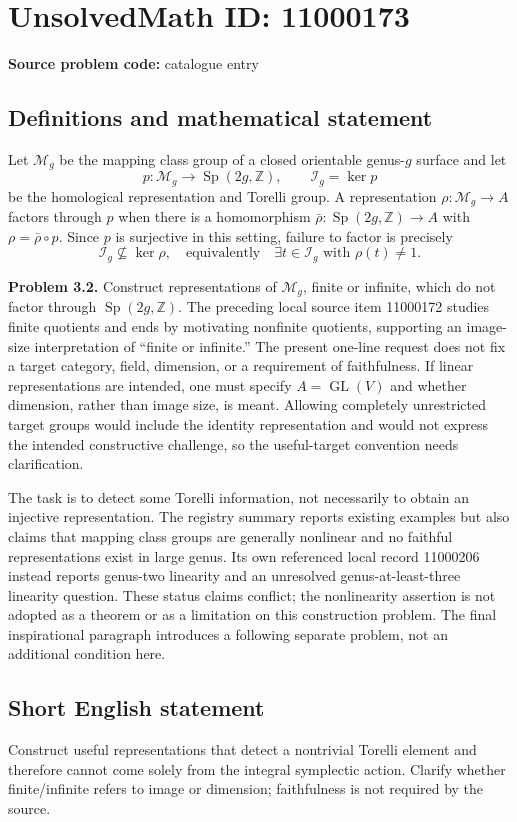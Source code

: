 \documentclass[11pt]{article}
\newcommand{\Z}{\mathbb{Z}}
\begin{document}
\section*{UnsolvedMath ID: 11000173}
\textbf{Source problem code:} catalogue entry
\subsection{Definitions and mathematical statement}
Let $\mathcal M_g$ be the mapping class group of a closed orientable genus-$g$ surface and let
\[
 p:\mathcal M_g\longrightarrow\operatorname{Sp}(2g,\Z),\qquad
 \mathcal I_g=\ker p
\]
be the homological representation and Torelli group. A representation $\rho:\mathcal M_g\to A$ factors through $p$ when there is a homomorphism $\bar\rho:\operatorname{Sp}(2g,\Z)\to A$ with $\rho=\bar\rho\circ p$. Since $p$ is surjective in this setting, failure to factor is precisely
\[
 \mathcal I_g\not\subseteq\ker\rho,
 \quad\text{equivalently}\quad
 \exists t\in\mathcal I_g\text{ with }\rho(t)\ne1.
\]

\textbf{Problem 3.2.} Construct representations of $\mathcal M_g$, finite or infinite, which do not factor through $\operatorname{Sp}(2g,\Z)$. The preceding local source item 11000172 studies finite quotients and ends by motivating nonfinite quotients, supporting an image-size interpretation of ``finite or infinite.'' The present one-line request does not fix a target category, field, dimension, or a requirement of faithfulness. If linear representations are intended, one must specify $A=\operatorname{GL}(V)$ and whether dimension, rather than image size, is meant. Allowing completely unrestricted target groups would include the identity representation and would not express the intended constructive challenge, so the useful-target convention needs clarification.

The task is to detect some Torelli information, not necessarily to obtain an injective representation. The registry summary reports existing examples but also claims that mapping class groups are generally nonlinear and no faithful representations exist in large genus. Its own referenced local record 11000206 instead reports genus-two linearity and an unresolved genus-at-least-three linearity question. These status claims conflict; the nonlinearity assertion is not adopted as a theorem or as a limitation on this construction problem. The final inspirational paragraph introduces a following separate problem, not an additional condition here.
\subsection{Short English statement}
Construct useful representations that detect a nontrivial Torelli element and therefore cannot come solely from the integral symplectic action. Clarify whether finite/infinite refers to image or dimension; faithfulness is not required by the source.
\end{document}
